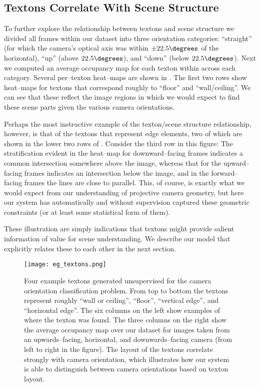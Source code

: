 \subsection{Textons Correlate With Scene Structure}
To further explore the relationship between textons and scene
structure we divided all frames within our dataset into three
orientation categories: ``straight'' (for which the camera's optical
axis was within $\pm 22.5\degrees$ of the horizontal), ``up'' (above
$22.5\degrees$), and ``down'' (below $22.5\degrees$). Next we computed
an average occupancy map for each texton within across each
category. Several per--texton heat--maps are shown in
. The first two rows show heat--maps for textons that
correspond roughly to ``floor'' and ``wall/ceiling''. We can see that
these reflect the image regions in which we would expect to find these
scene parts given the various camera orientations.

Perhaps the most instructive example of the texton/scene structure
relationship, however, is that of the textons that represent edge
elements, two of which are shown in the lower two rows of
. Consider the third row in this figure: The
stratification evident in the heat--map for downward--facing frames
indicates a common intersection somewhere above the image, whereas
that for the upward--facing frames indicates an intersection below the
image, and in the forward--facing frames the lines are close to
parallel. This, of course, is exactly what we would expect from our
understanding of projective camera geometry, but here our system has
automatically and without supervision captured these geometric
constraints (or at least some statistical form of them).

These illustration are simply indications that textons might provide
salient information of value for scene understanding. We describe our
model that explicitly relates these to each other in the next section.

\begin{figure*}[htp]
\centering
\texttt{[image: eg\_textons.png]}
\caption{Four example textons generated unsupervised for the camera
  orientation classification problem. From top to bottom the textons
  represent roughly ``wall or ceiling'', ``floor'', ``vertical edge'',
  and ``horizontal edge''. The six columns on the left show examples
  of where the texton was found. The three columns on the right show
  the average occupancy map over our dataset for images taken from an
  upwards--facing, horizontal, and downwards--facing camera (from left
  to right in the figure). The layout of the textons correlate
  strongly with camera orientation, which illustrates how our system
  is able to distinguish between camera orientations based on texton
  layout.}
\label{fig:eg-textons}
\end{figure*}

